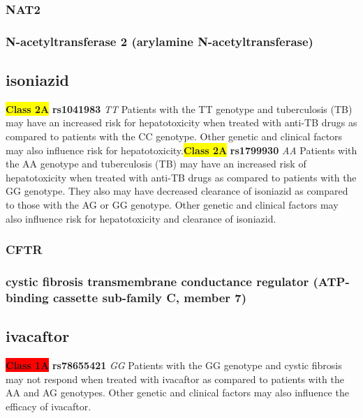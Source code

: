 \documentclass{book}
\begin{document}
\subsubsection{ NAT2 }
\subsubsection{ N-acetyltransferase 2 (arylamine N-acetyltransferase) }

\subsection{ isoniazid }


\begin{center}


\textbf{\colorbox{yellow} {Class 2A}} \textbf{ rs1041983 } \textit{ TT }
Patients with the TT genotype and tuberculosis (TB) may have an increased risk for hepatotoxicity when treated with anti-TB drugs as compared to patients with the CC genotype. Other genetic and clinical factors may also influence risk for hepatotoxicity.\textbf{\colorbox{yellow} {Class 2A}} \textbf{ rs1799930 } \textit{ AA }
Patients with the AA genotype and tuberculosis (TB) may have an increased risk of hepatotoxicity when treated with anti-TB drugs as compared to patients with the GG genotype. They also may have decreased clearance of isoniazid as compared to those with the AG or GG genotype. Other genetic and clinical factors may also influence risk for hepatotoxicity and clearance of isoniazid.


\end{center}






\subsubsection{ CFTR }
\subsubsection{ cystic fibrosis transmembrane conductance regulator (ATP-binding cassette sub-family C, member 7) }

\subsection{ ivacaftor }


\begin{center}
\textbf{\colorbox{red} {Class 1A}} \textbf{ rs78655421 } \textit{ GG }
Patients with the GG genotype and cystic fibrosis may not respond when treated with ivacaftor as compared to patients with the AA and AG genotypes. Other genetic and clinical factors may also influence the efficacy of ivacaftor.




\end{center}
\end{document}
